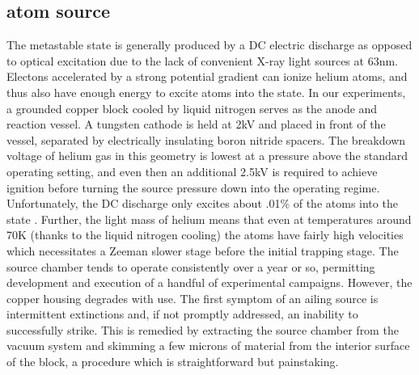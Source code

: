 	


\subsection*{\mhe atom source}

	The metastable \mhe state is generally produced by a DC electric discharge as opposed to optical excitation due to the lack of convenient X-ray light sources at 63nm.
	Electons accelerated by a strong potential gradient can ionize helium atoms, and thus also have enough energy to excite atoms into the \mhe state.
	In our experiments, a grounded copper block cooled by liquid nitrogen serves as the anode and reaction vessel.
	A tungsten cathode is held at 2kV and placed in front of the vessel, separated by electrically insulating boron nitride spacers.
	The breakdown voltage of helium gas in this geometry is lowest at a pressure above the standard operating setting, and even then an additional 2.5kV is required to achieve ignition before turning the source pressure down into the operating regime.
	Unfortunately, the DC discharge only excites about .01\% of the atoms into the \mhe state \cite{Stas06}.
	Further, the light mass of helium means that even at temperatures around 70K (thanks to the liquid nitrogen cooling) the atoms have fairly high velocities which necessitates a Zeeman slower stage before the initial trapping stage. 
	The source chamber tends to operate consistently over a year or so, permitting development and execution of a handful of experimental campaigns.
	However, the copper housing degrades with use.
	The first symptom of an ailing source is intermittent extinctions and, if not promptly addressed, an inability to successfully strike.
	This is remedied by extracting the source chamber from the vacuum system and skimming a few microns of material from the interior surface of the block, a procedure which is  straightforward but painstaking.
	


